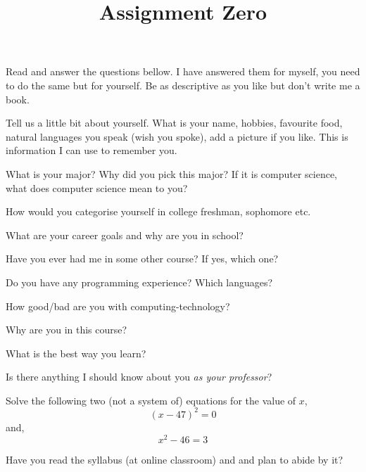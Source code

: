 \documentclass{homework}
\title{Assignment Zero}
\begin{document}
 \maketitle


Read and answer the questions bellow. I have answered them for myself,
you need to do the same but for yourself. Be as descriptive as you
like but don’t write me a book.

\question Tell us a little bit about yourself. What is your name,
hobbies, favourite food, natural languages you speak (wish you spoke),
add a picture if you like. This is information I can use to remember
you.


\question What is your major? Why did you pick this major? If it is
computer science, what does computer science mean to you?

\question How would you categorise yourself in college \eg freshman,
sophomore etc.

\question What are your career goals and why are you in school?

\question Have you ever had me in some other course? If yes, which one?

\question Do you have any programming experience? Which languages?

\question How good/bad are you with computing-technology?

\question Why are you in this course?

\question What is the best way you learn?

\question Is there anything I should know about you \textit{as your
  professor}?

\question Solve the following two (not a system of) equations for the
value of $x$,
\[
    (x-47)^2=0
\]
and,
\[
    x^2-46=3
\]

\question Have you read the syllabus (at online classroom) and and
plan to abide by it?
\end{document}
